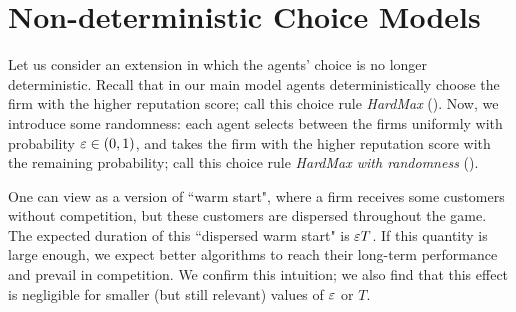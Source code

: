 \documentclass[../competing_bandits.tex]{subfiles}
\begin{document}
\section{Non-deterministic Choice Models}\label{sec:non_greedy}

Let us consider an extension in which the agents' choice is no longer deterministic. Recall that in our main model agents deterministically choose the firm with the higher reputation score; call this choice rule \emph{HardMax} (\HM). Now, we introduce some randomness: each agent selects between the firms uniformly with probability $\varepsilon\in (0,1)$, and takes the firm with the higher reputation score with the remaining probability; call this choice rule \emph{HardMax with randomness} (\HMR). 

One can view \HMR as a version of ``warm start", where a firm receives some customers without competition, but these customers are dispersed throughout the game. The expected duration of this ``dispersed warm start" is $\varepsilon T$. If this quantity is large enough, we expect better algorithms to reach their long-term performance and prevail in competition. We confirm this intuition; we also find that this effect is negligible for smaller (but still relevant) values of $\varepsilon$ or $T$.

\end{document}
